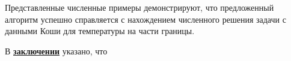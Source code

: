 Представленные численные примеры демонстрируют, что предложенный
алгоритм успешно справляется с нахождением численного решения задачи
с данными Коши для температуры на части границы.

\FloatBarrier
{}                                  %
В \underline{\textbf{заключении}} указано, что



